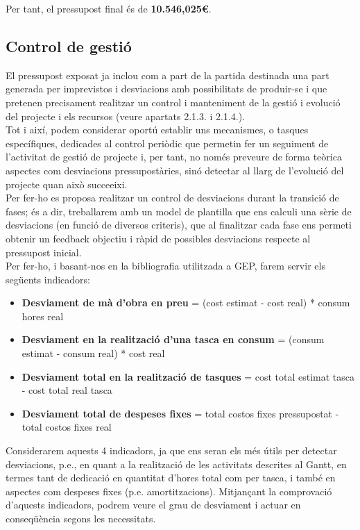Per tant, el pressupost final és de \textbf{10.546,025\euro}.

\subsection{Control de gestió}

El pressupost exposat ja inclou com a part de la partida destinada una part generada per imprevistos i desviacions amb possibilitats de produir-se i que pretenen precisament realitzar un control i manteniment de la gestió i evolució del projecte i els recursos (veure apartats 2.1.3. i 2.1.4.).\\

Tot i així, podem considerar oportú establir uns mecanismes, o tasques específiques, dedicades al control periòdic que permetin fer un seguiment de l’activitat de gestió de projecte i, per tant, no només preveure de forma teòrica aspectes com desviacions pressupostàries, sinó detectar al llarg de l’evolució del projecte quan això succeeixi.\\

Per fer-ho es proposa realitzar un control de desviacions durant la transició de fases; és a dir, treballarem amb un model de plantilla que ens calculi una sèrie de desviacions (en funció de diversos criteris), que al finalitzar cada fase ens permeti obtenir un feedback objectiu i ràpid de possibles desviacions respecte al pressupost inicial.\\

Per fer-ho, i basant-nos en la bibliografia utilitzada a GEP, farem servir els següents indicadors:

\begin{itemize}
\item \textbf{Desviament de mà d’obra en preu} = (cost estimat - cost real) * consum hores real
\item \textbf{Desviament en la realització d’una tasca en consum} = (consum estimat - consum real) * cost real
\item \textbf{Desviament total en la realització de tasques} = cost total estimat tasca - cost total real tasca
\item \textbf{Desviament total de despeses fixes} = total costos fixes pressupostat - total costos fixes real
\end{itemize}

Considerarem aquests 4 indicadors, ja que ens seran els més útils per detectar desviacions, p.e., en quant a la realització de les activitats descrites al Gantt, en termes tant de dedicació en quantitat d’hores total com per tasca, i també en aspectes com despeses fixes (p.e. amortitzacions). Mitjançant la comprovació d’aquests indicadors, podrem veure el grau de desviament i actuar en conseqüència segons les necessitats. 

